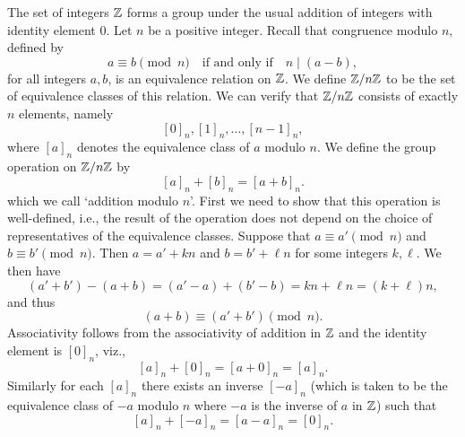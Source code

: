 \begin{example}[\(\Z\) and \(\Z/n\Z\)]
    \label{def:z-and-zmodn}
    The set of integers \(\Z\) forms a group under the usual addition of
    integers with identity element \(0\). Let \(n\) be a positive integer.
    Recall that congruence modulo \(n\), defined by
    \[
        a \equiv b \pmod{n} \quad \text{if and only if} \quad n \mid (a - b),
    \]
    for all integers \(a, b\), is an equivalence relation on \(\Z\). We define
    \(\Z/n\Z\) to be the set of equivalence classes of this relation. We can
    verify that \(\Z/n\Z\) consists of exactly \(n\) elements, namely
    \[
        [0]_n, [1]_n, \ldots, [n - 1]_n,
    \]
    where \([a]_n\) denotes the equivalence class of \(a\) modulo \(n\). We
    define the group operation on \(\Z/n\Z\) by
    \[
        [a]_n + [b]_n = [a + b]_n.
    \]
    which we call `addition modulo \(n\)'.  First we need to show that this
    operation is well-defined, i.e., the result of the operation does not depend
    on the choice of representatives of the equivalence classes. Suppose that
    \(a \equiv a' \pmod{n}\) and \(b \equiv b' \pmod{n}\). Then \(a = a' + kn\)
    and \(b = b' + \ell n\) for some integers \(k, \ell\). We then have
    \[
        (a' + b') - (a + b) = (a' - a) + (b' - b) = kn + \ell n = (k + \ell)n,
    \]
    and thus
    \[
        (a + b) \equiv (a' + b') \pmod{n}.
    \]
    Associativity follows from the associativity of addition in \(\Z\) and the
    identity element is \([0]_n\), viz.,
    \[
        [a]_n + [0]_n = [a + 0]_n = [a]_n.
    \]
    Similarly for each \([a]_n\) there exists an inverse \([-a]_n\) (which is
    taken to be the equivalence class of \(-a\) modulo \(n\) where \(-a\) is the
    inverse of \(a\) in \(\Z\)) such that
    \[
        [a]_n + [-a]_n = [a - a]_n = [0]_n.
    \]
\end{example}

